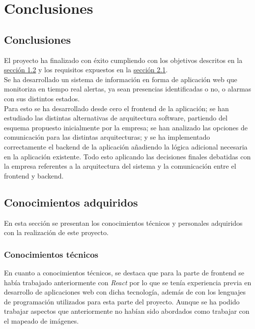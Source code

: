 \chapter{Conclusiones}

\section{Conclusiones}


El proyecto ha finalizado con éxito cumpliendo con los objetivos descritos en la \hyperref[section-objetivos]{sección 1.2} y los requisitos expuestos en la \hyperref[section-requisitos]{sección 2.1}.\\

Se ha desarrollado un sistema de información en forma de aplicación web que monitoriza en tiempo real alertas, ya sean presencias identificadas o no, o alarmas con sus distintos estados.\\

Para esto se ha desarrollado desde cero el frontend de la aplicación; se han estudiado las distintas alternativas de arquitectura software, partiendo del esquema propuesto inicialmente por la empresa; se han analizado las opciones de comunicación para las distintas arquitecturas; y se ha implementado correctamente el backend de la aplicación añadiendo la lógica adicional necesaria en la aplicación existente. Todo esto aplicando las decisiones finales debatidas con la empresa referentes a la arquitectura del sistema y la comunicación entre el frontend y backend.
 

\section{Conocimientos adquiridos}

En esta sección se presentan los conocimientos técnicos y personales adquiridos con la realización de este proyecto.

\subsection{Conocimientos técnicos}


En cuanto a conocimientos técnicos, se destaca que para la parte de frontend se había trabajado anteriormente con \textit{React} por lo que se tenía experiencia previa en desarrollo de aplicaciones web con dicha tecnología, además de con los lenguajes de programación utilizados para esta parte del proyecto. Aunque se ha podido trabajar aspectos que anteriormente no habían sido abordados como trabajar con el mapeado de imágenes. \\

